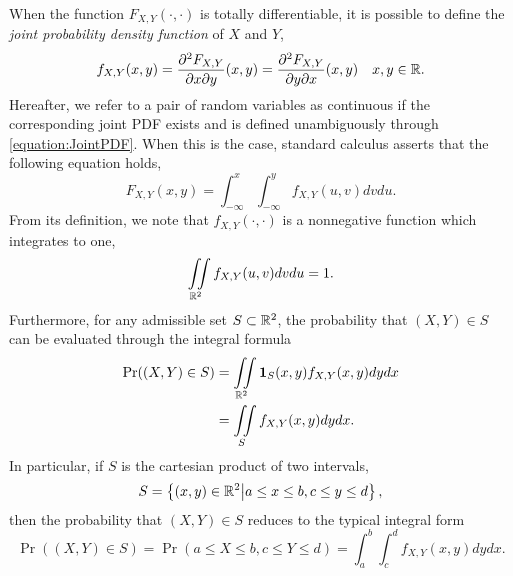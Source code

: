 When the function $F_{X,Y} (\cdot, \cdot)$ is totally differentiable, it is possible to define the \emph{joint probability density function} of $X$ and $Y$, 
\begin{equation} \label{equation:JointPDF}
f_{X,Y} (x,y) = \frac{\partial^2 F_{X,Y}}{\partial x \partial y} (x,y)
= \frac{\partial^2 F_{X,Y}}{\partial y \partial x} (x,y) \quad x,y \in  \mathbb{R} .
\end{equation}
Hereafter, we refer to a pair of random variables as continuous if the corresponding joint PDF exists and is defined unambiguously through \eqref{equation:JointPDF}.
When this is the case, standard calculus asserts that the following equation holds,
\begin{equation*}
F_{X,Y} (x,y) = \int_{-\infty}^x \int_{-\infty}^y f_{X,Y} (u,v) dv du .
\end{equation*}
From its definition, we note that $f_{X,Y} (\cdot, \cdot)$ is a nonnegative function which integrates to one,
\begin{equation*}
\iint\limits_{\mathbb{R}^2}
f_{X, Y} (u, v) dv du = 1.
\end{equation*}
Furthermore, for any admissible set $S \subset \mathbb{R}^2$, the probability that $(X,Y) \in S$ can be evaluated through the integral formula
\begin{equation} \label{equation:ProbabilityJointPDF}
\begin{split}
\Pr ((X,Y) \in S)
&= \iint\limits_{\mathbb{R}^2}
\mathbf{1}_{S} (x, y) f_{X, Y} (x, y) dy dx \\
&= \iint\limits_{S}
f_{X, Y} (x, y) dy dx .
\end{split}
\end{equation}
In particular, if $S$ is the cartesian product of two intervals, 
\begin{equation*}
S = \left\{ (x,y) \in \mathbb{R}^2 \big| a \leq x \leq b, c \leq y \leq d \right\} ,
\end{equation*}
then the probability that $(X,Y) \in S$ reduces to the typical integral form
\begin{equation*}
\Pr ((X,Y) \in S)
= \Pr (a \leq X \leq b, c \leq Y \leq d)
= \int_{a}^{b} \int_{c}^{d}
f_{X, Y} (x, y) dy dx .
\end{equation*}

